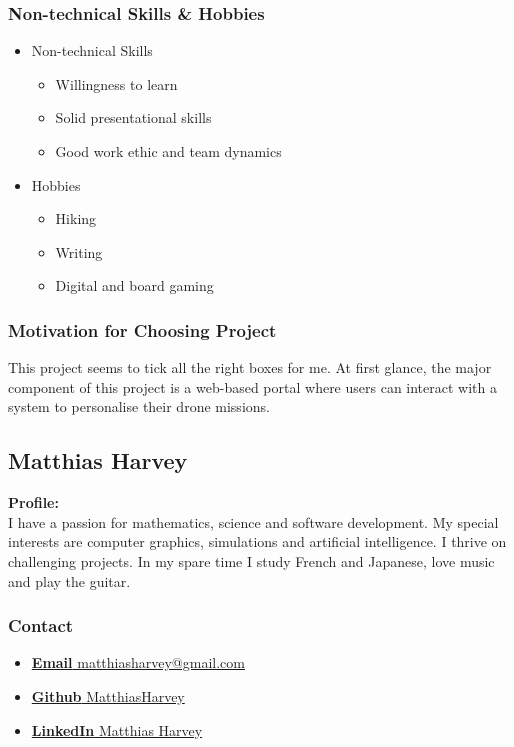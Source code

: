 \documentclass{article}
\begin{document}
\subsubsection{Non-technical Skills \& Hobbies}
\begin{itemize}
	\item Non-technical Skills
	\begin{itemize}
		\item Willingness to learn
		\item Solid presentational skills
		\item Good work ethic and team dynamics
	\end{itemize}
	\item Hobbies
	\begin{itemize}
		\item Hiking
		\item Writing
		\item Digital and board gaming
	\end{itemize}
\end{itemize}
\subsubsection{Motivation for Choosing Project}
This project seems to tick all the right boxes for me. At first glance, the major component of this project is a web-based portal where users can interact with a system to personalise their drone missions.   

\cleardoublepage

\subsection{Matthias Harvey}
\textbf{Profile:}\\
I have a passion for mathematics, science and software development. My special interests are computer graphics, simulations and artificial intelligence. I thrive on challenging projects. In my spare time I study French and Japanese, love music and play the guitar.
\subsubsection{Contact}
\begin{itemize}
	\item \href{mailto:matthiasharvey@gmail.com}{\textbf{Email} matthiasharvey@gmail.com}
	\item \href{https://github.com/MatthiasHarvey}{\textbf{Github} MatthiasHarvey}	
	\item \href{https://za.linkedin.com/in/matthias-harvey-68b30995}{\textbf{LinkedIn} Matthias Harvey}
\end{itemize}
\end{document}
